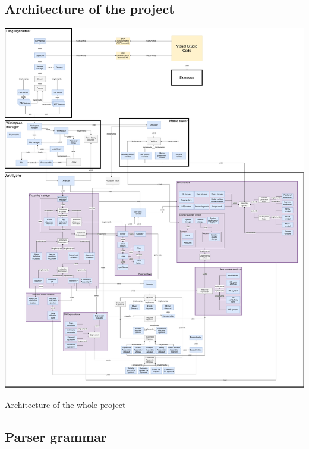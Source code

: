 \documentclass[10pt,a4paper]{report}
\begin{document}
\printindex
\begin{appendices}


\begin{foldoutfloat}
	\chapter{Architecture of the project}
	\label{all_arch}
	\thispagestyle{empty}

	\includegraphics[width=35cm]{img/all_arch}
	\caption{Architecture of the whole project}
\end{foldoutfloat}

\begin{foldoutfloatlandscape}
	\chapter{Parser grammar}
	\label{parser_rules}
	\thispagestyle{empty}
	

\end{foldoutfloatlandscape}
\end{appendices}
\end{document}
